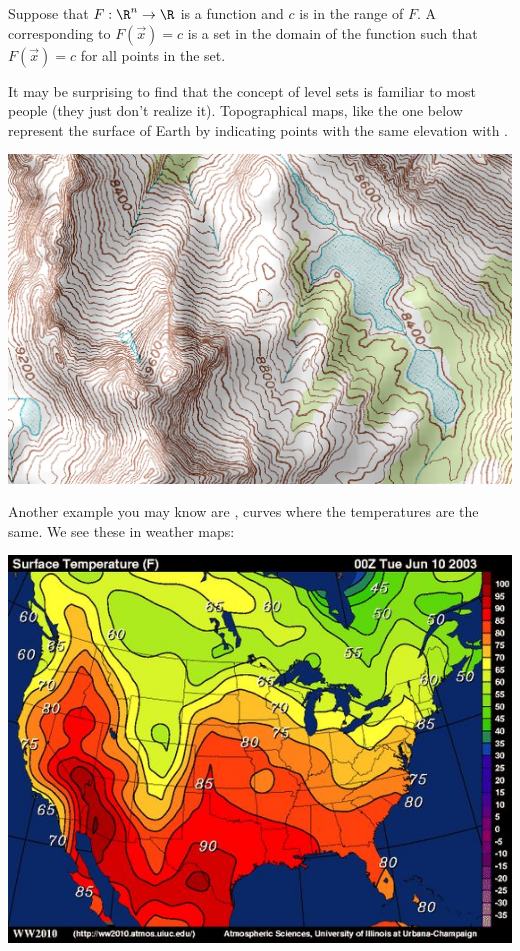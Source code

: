 \documentclass{ximera}
\begin{document}
\begin{definition}
  Suppose that $F:\R^n \to \R$ is a function and $c$ is in the range
  of $F$. A  corresponding to $F(\vec{x})=c$ is a set
  in the domain of the function such that $F(\vec{x}) = c$ for all
  points in the set.
\end{definition}



It may be surprising to find that the concept of level sets is
familiar to most people (they just don't realize it).  Topographical
maps, like the one below represent the surface of Earth by
indicating points with the same elevation with .

\begin{image}%
  \includegraphics{topomap.jpg}
\end{image}

Another example you may know are , curves where the
temperatures are the same. We see these in weather maps:

\begin{image}
  \includegraphics{isotherm.jpg}
\end{image}
\end{document}
